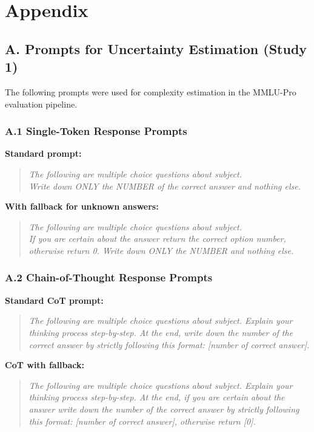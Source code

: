 \chapter*{Appendix}

\section*{A. Prompts for Uncertainty Estimation (Study 1)}

The following prompts were used for complexity estimation in the MMLU-Pro evaluation pipeline.

\subsection*{A.1 Single-Token Response Prompts}

\textbf{Standard prompt:}
\begin{quote}
\textit{The following are multiple choice questions about subject.\\
Write down ONLY the NUMBER of the correct answer and nothing else.}
\end{quote}

\textbf{With fallback for unknown answers:}
\begin{quote}
\textit{The following are multiple choice questions about subject.\\
If you are certain about the answer return the correct option number, otherwise return 0. Write down ONLY the NUMBER and nothing else.}
\end{quote}

\subsection*{A.2 Chain-of-Thought Response Prompts}

\textbf{Standard CoT prompt:}
\begin{quote}
\textit{The following are multiple choice questions about subject. Explain your thinking process step-by-step. At the end, write down the number of the correct answer by strictly following this format: [number of correct answer].}
\end{quote}

\textbf{CoT with fallback:}
\begin{quote}
\textit{The following are multiple choice questions about subject. Explain your thinking process step-by-step. At the end, if you are certain about the answer write down the number of the correct answer by strictly following this format: [number of correct answer], otherwise return [0].}
\end{quote}

